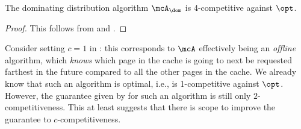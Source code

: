\begin{corollary}
    \label{corollary:dom-is-4-competitive}
    The dominating distribution algorithm $\mcA_\dom$ is 4-competitive against $\opt$.
\end{corollary}
\begin{proof}
    This follows from  and .
\end{proof}

\begin{remark}
    \label{remark:suboptimal-fifo}
    Consider setting $c=1$ in : this corresponds to $\mcA$ effectively being an \textit{offline} algorithm, which \textit{knows} which page in the cache is going to next be requested farthest in the future compared to all the other pages in the cache. We already know that such an algorithm is optimal, i.e., is 1-competitive against $\opt$. However, the guarantee given by  for such an algorithm is still only $2$-competitiveness. This at least suggests that there is scope to improve the guarantee to $c$-competitiveness. %
\end{remark}
